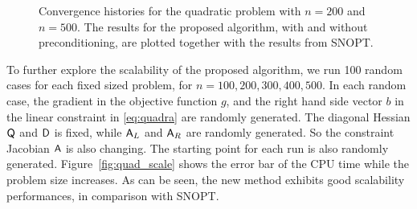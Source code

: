 \begin{figure}[tbp]
  \centering
   \hspace{1em}
   \caption{Convergence histories for the quadratic problem with $n=200$ and
  $n=500$. The results for the proposed algorithm, with and without
  preconditioning, are plotted together with the results from
  SNOPT.\label{fig:quad_hist}}
\end{figure}

To further explore the scalability of the proposed algorithm, we run 100 random cases for 
each fixed sized problem, for $n = 100, 200, 300, 400, 500$.  In each random case, the gradient 
in the objective function $g$, and the right hand side vector $b$ in the linear constraint in \eqref{eq:quadra} 
are randomly generated. The diagonal Hessian $\mathsf{Q}$ and $\mathsf{D}$ is fixed, while $\mathsf{A}_L$ and $\mathsf{A}_R$ are randomly generated. So the constraint Jacobian $\mathsf{A}$ is also changing. The starting point for each run is also randomly generated. Figure~\ref{fig:quad_scale} shows the error bar of the CPU time while
the problem size increases. As can be seen, the new method exhibits good scalability performances, in comparison with SNOPT. 

